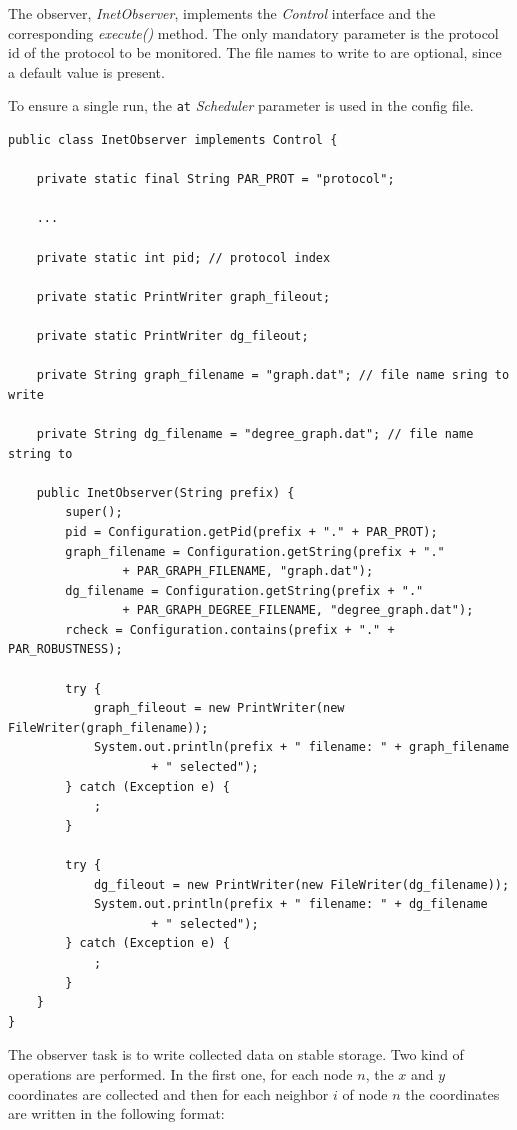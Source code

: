 \documentclass[a4paper,12pt]{article}
\begin{document}
The observer, \emph{InetObserver}, implements the \emph{Control} interface and the corresponding
\emph{execute()} method. The only mandatory parameter is the protocol
id of the protocol to be monitored. The file names to write to are
optional, since a default value is present.

To ensure a single run, the \texttt{at} \emph{Scheduler} parameter is
used in the config file.

\footnotesize
\begin{verbatim}
public class InetObserver implements Control {
    
    private static final String PAR_PROT = "protocol";

    ...
    
    private static int pid; // protocol index

    private static PrintWriter graph_fileout;

    private static PrintWriter dg_fileout;

    private String graph_filename = "graph.dat"; // file name sring to write

    private String dg_filename = "degree_graph.dat"; // file name string to

    public InetObserver(String prefix) {
        super();
        pid = Configuration.getPid(prefix + "." + PAR_PROT);
        graph_filename = Configuration.getString(prefix + "."
                + PAR_GRAPH_FILENAME, "graph.dat");
        dg_filename = Configuration.getString(prefix + "."
                + PAR_GRAPH_DEGREE_FILENAME, "degree_graph.dat");
        rcheck = Configuration.contains(prefix + "." + PAR_ROBUSTNESS);

        try {
            graph_fileout = new PrintWriter(new FileWriter(graph_filename));
            System.out.println(prefix + " filename: " + graph_filename
                    + " selected");
        } catch (Exception e) {
            ;
        }

        try {
            dg_fileout = new PrintWriter(new FileWriter(dg_filename));
            System.out.println(prefix + " filename: " + dg_filename
                    + " selected");
        } catch (Exception e) {
            ;
        }
    }
}
\end{verbatim}
\normalsize

The observer task is to write collected data on stable storage. Two kind of
operations are performed. In the first one, for each node
$n$, the $x$ and $y$ coordinates are collected and then for each
neighbor $i$ of node $n$ the coordinates are written in the following
format:  
\end{document}
